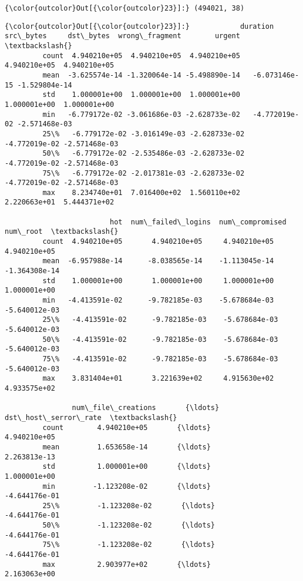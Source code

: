 \documentclass[11pt]{article}
\begin{document}
\begin{Verbatim}[commandchars=\\\{\}]
{\color{outcolor}Out[{\color{outcolor}23}]:} (494021, 38)
\end{Verbatim}
            
\begin{Verbatim}[commandchars=\\\{\}]
{\color{outcolor}Out[{\color{outcolor}23}]:}            duration     src\_bytes     dst\_bytes  wrong\_fragment        urgent  \textbackslash{}
         count  4.940210e+05  4.940210e+05  4.940210e+05    4.940210e+05  4.940210e+05   
         mean  -3.625574e-14 -1.320064e-14 -5.498890e-14   -6.073146e-15 -1.529804e-14   
         std    1.000001e+00  1.000001e+00  1.000001e+00    1.000001e+00  1.000001e+00   
         min   -6.779172e-02 -3.061686e-03 -2.628733e-02   -4.772019e-02 -2.571468e-03   
         25\%   -6.779172e-02 -3.016149e-03 -2.628733e-02   -4.772019e-02 -2.571468e-03   
         50\%   -6.779172e-02 -2.535486e-03 -2.628733e-02   -4.772019e-02 -2.571468e-03   
         75\%   -6.779172e-02 -2.017381e-03 -2.628733e-02   -4.772019e-02 -2.571468e-03   
         max    8.234740e+01  7.016400e+02  1.560110e+02    2.220663e+01  5.444371e+02   
         
                         hot  num\_failed\_logins  num\_compromised      num\_root  \textbackslash{}
         count  4.940210e+05       4.940210e+05     4.940210e+05  4.940210e+05   
         mean  -6.957988e-14      -8.038565e-14    -1.113045e-14 -1.364308e-14   
         std    1.000001e+00       1.000001e+00     1.000001e+00  1.000001e+00   
         min   -4.413591e-02      -9.782185e-03    -5.678684e-03 -5.640012e-03   
         25\%   -4.413591e-02      -9.782185e-03    -5.678684e-03 -5.640012e-03   
         50\%   -4.413591e-02      -9.782185e-03    -5.678684e-03 -5.640012e-03   
         75\%   -4.413591e-02      -9.782185e-03    -5.678684e-03 -5.640012e-03   
         max    3.831404e+01       3.221639e+02     4.915630e+02  4.933575e+02   
         
                num\_file\_creations       {\ldots}        dst\_host\_serror\_rate  \textbackslash{}
         count        4.940210e+05       {\ldots}                4.940210e+05   
         mean         1.653658e-14       {\ldots}                2.263813e-13   
         std          1.000001e+00       {\ldots}                1.000001e+00   
         min         -1.123208e-02       {\ldots}               -4.644176e-01   
         25\%         -1.123208e-02       {\ldots}               -4.644176e-01   
         50\%         -1.123208e-02       {\ldots}               -4.644176e-01   
         75\%         -1.123208e-02       {\ldots}               -4.644176e-01   
         max          2.903977e+02       {\ldots}                2.163063e+00   
         

\end{Verbatim}
\end{document}
